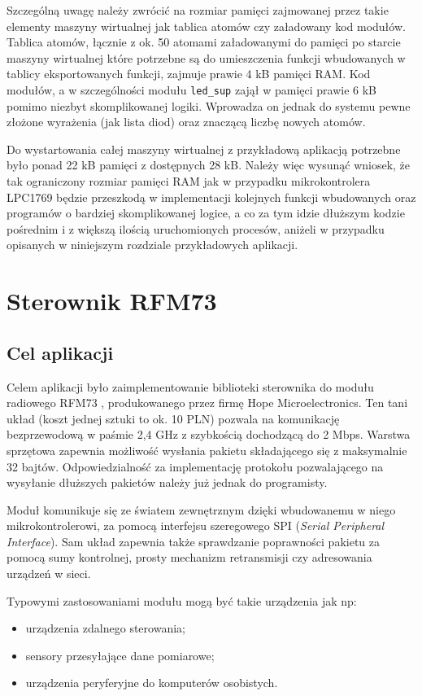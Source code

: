 Szczególną uwagę należy zwrócić na rozmiar pamięci zajmowanej przez takie elementy maszyny wirtualnej jak tablica atomów czy załadowany kod modułów.
Tablica atomów, łącznie z ok. 50 atomami załadowanymi do pamięci po starcie maszyny wirtualnej które potrzebne są do umieszczenia funkcji wbudowanych w tablicy eksportowanych funkcji, zajmuje prawie 4 kB pamięci RAM.  
Kod modułów, a w szczególności modułu \texttt{led\_sup} zajął w pamięci prawie 6 kB pomimo niezbyt skomplikowanej logiki. Wprowadza on jednak do systemu pewne złożone wyrażenia (jak lista diod) oraz znaczącą liczbę nowych atomów.

Do wystartowania całej maszyny wirtualnej z przykładową aplikacją potrzebne było ponad 22 kB pamięci z dostępnych 28 kB.
Należy więc wysunąć wniosek, że tak ograniczony rozmiar pamięci RAM jak w przypadku mikrokontrolera LPC1769 będzie przeszkodą w implementacji kolejnych funkcji wbudowanych oraz programów o bardziej skomplikowanej logice, a co za tym idzie dłuższym kodzie pośrednim i z większą ilością uruchomionych procesów, aniżeli w przypadku opisanych w niniejszym rozdziale przykładowych aplikacji.

\section{Sterownik RFM73}
\label{sec:przykladyRfm}

\subsection{Cel aplikacji}

Celem aplikacji było zaimplementowanie biblioteki sterownika do modułu radiowego RFM73 \cite{RFM73}, produkowanego przez firmę Hope Microelectronics.
Ten tani układ (koszt jednej sztuki to ok. 10 PLN) pozwala na komunikację bezprzewodową w paśmie 2,4 GHz z szybkością dochodzącą do 2 Mbps. Warstwa sprzętowa zapewnia możliwość wysłania pakietu składającego się z maksymalnie 32 bajtów.
Odpowiedzialność za implementację protokołu pozwalającego na wysyłanie dłuższych pakietów należy już jednak do programisty.

Moduł komunikuje się ze światem zewnętrznym dzięki wbudowanemu w niego mikrokontrolerowi, za pomocą interfejsu szeregowego SPI (\emph{Serial Peripheral Interface}). Sam układ zapewnia także sprawdzanie poprawności pakietu za pomocą sumy kontrolnej, prosty mechanizm retransmisji czy adresowania urządzeń w sieci.

Typowymi zastosowaniami modułu mogą być takie urządzenia jak np:
\begin{itemize}
\item urządzenia zdalnego sterowania;
\item sensory przesyłające dane pomiarowe;
\item urządzenia peryferyjne do komputerów osobistych.
\end{itemize}

